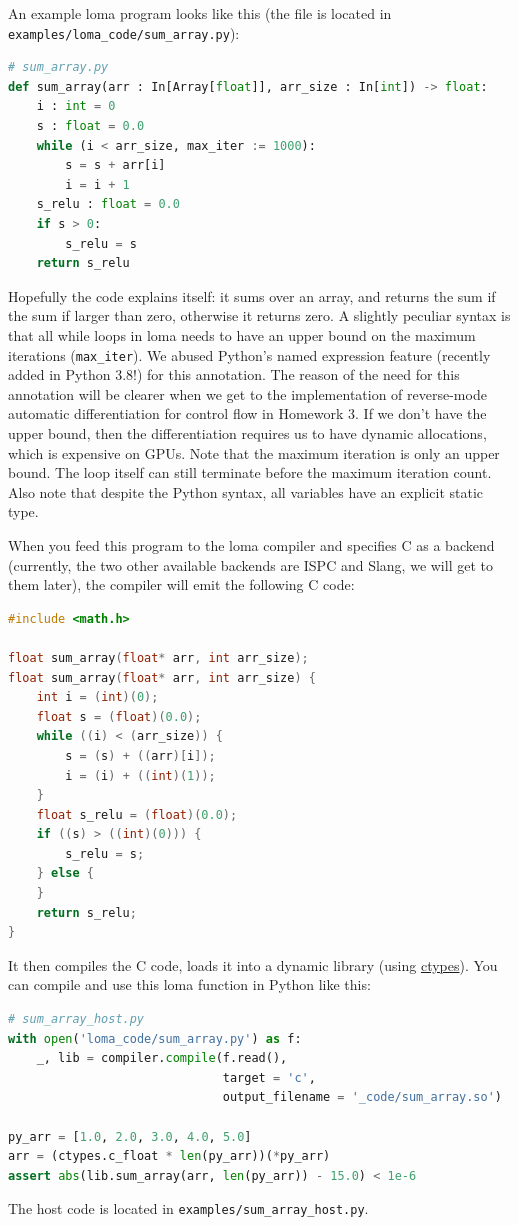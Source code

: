 An example loma program looks like this (the file is located in \lstinline{examples/loma_code/sum_array.py}):
\begin{lstlisting}[language=python]
# sum_array.py
def sum_array(arr : In[Array[float]], arr_size : In[int]) -> float:
    i : int = 0
    s : float = 0.0
    while (i < arr_size, max_iter := 1000):
        s = s + arr[i]
        i = i + 1
    s_relu : float = 0.0
    if s > 0:
        s_relu = s
    return s_relu
\end{lstlisting}
Hopefully the code explains itself: it sums over an array, and returns the sum if the sum if larger than zero, otherwise it returns zero. A slightly peculiar syntax is that all while loops in loma needs to have an upper bound on the maximum iterations (\lstinline{max_iter}). We abused Python's named expression feature (recently added in Python 3.8!) for this annotation. The reason of the need for this annotation will be clearer when we get to the implementation of reverse-mode automatic differentiation for control flow in Homework 3. If we don't have the upper bound, then the differentiation requires us to have dynamic allocations, which is expensive on GPUs. Note that the maximum iteration is only an upper bound. The loop itself can still terminate before the maximum iteration count. Also note that despite the Python syntax, all variables have an explicit static type.

When you feed this program to the loma compiler and specifies C as a backend (currently, the two other available backends are ISPC and Slang, we will get to them later), the compiler will emit the following C code:
\begin{lstlisting}[language=c]
#include <math.h>
        
float sum_array(float* arr, int arr_size);
float sum_array(float* arr, int arr_size) {
    int i = (int)(0);
    float s = (float)(0.0);
    while ((i) < (arr_size)) {
        s = (s) + ((arr)[i]);
        i = (i) + ((int)(1));
    }
    float s_relu = (float)(0.0);
    if ((s) > ((int)(0))) {
        s_relu = s;
    } else {
    }
    return s_relu;
}
\end{lstlisting}

It then compiles the C code, loads it into a dynamic library (using \href{https://docs.python.org/3/library/ctypes.html}{ctypes}). You can compile and use this loma function in Python like this:
\begin{lstlisting}[language=python]
# sum_array_host.py
with open('loma_code/sum_array.py') as f:
    _, lib = compiler.compile(f.read(),
                              target = 'c',
                              output_filename = '_code/sum_array.so')

py_arr = [1.0, 2.0, 3.0, 4.0, 5.0]
arr = (ctypes.c_float * len(py_arr))(*py_arr)
assert abs(lib.sum_array(arr, len(py_arr)) - 15.0) < 1e-6
\end{lstlisting}
The host code is located in \lstinline{examples/sum_array_host.py}.

